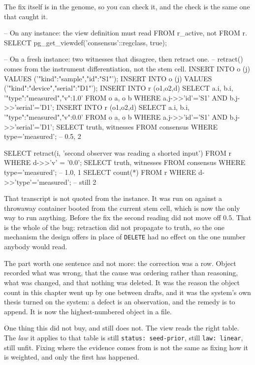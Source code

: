 The fix itself is in the genome, so you can check it, and the check is the same one that caught it.

\begin{Check}
-- On any instance: the view definition must read FROM r_active, not FROM r.
SELECT pg_get_viewdef('consensus'::regclass, true);

-- On a fresh instance: two witnesses that disagree, then retract one.
-- retract() comes from the instrument differentiation, not the stem cell.
INSERT INTO o (j) VALUES ('{"kind":"sample","id":"S1"}');
INSERT INTO o (j) VALUES ('{"kind":"device","serial":"D1"}');
INSERT INTO r (o1,o2,d)
  SELECT a.i, b.i, '{"type":"measured","v":1.0}' FROM o a, o b
  WHERE a.j->>'id'='S1' AND b.j->>'serial'='D1';
INSERT INTO r (o1,o2,d)
  SELECT a.i, b.i, '{"type":"measured","v":0.0}' FROM o a, o b
  WHERE a.j->>'id'='S1' AND b.j->>'serial'='D1';
SELECT truth, witnesses FROM consensus WHERE type='measured';   -- 0.5, 2

SELECT retract(i, 'second observer was reading a shorted input')
  FROM r WHERE d->>'v' = '0.0';
SELECT truth, witnesses FROM consensus WHERE type='measured';   -- 1.0, 1
SELECT count(*) FROM r WHERE d->>'type'='measured';             -- still 2
\end{Check}

That transcript is not quoted from the \labLineageName{} instance. It was run on \labLineageWipeDate{} against a throwaway container booted from the current stem cell, which is now the only way to run anything. Before the fix the second reading did not move off $0.5$. That is the whole of the bug: retraction did not propagate to truth, so the one mechanism the design offers in place of \texttt{DELETE} had no effect on the one number anybody would read.

The part worth one sentence and not more: the correction was a row. Object \labLineageObjects{} recorded what was wrong, that the cause was ordering rather than reasoning, what was changed, and that nothing was deleted. It was the reason the object count in this chapter went up by one between drafts, and it was the system's own thesis turned on the system: a defect is an observation, and the remedy is to append. It is now the highest-numbered object in a file.

One thing this did not buy, and still does not. The view reads the right table. The \emph{law} it applies to that table is still \texttt{status: seed-prior}, still \texttt{law: linear}, still unfit. Fixing where the evidence comes from is not the same as fixing how it is weighted, and only the first has happened.


